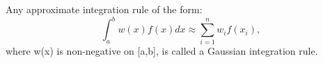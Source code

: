 Any approximate integration rule of the form:
\[ \int _a ^b w(x) f(x) dx \approx \sum _{i=1} ^n w_i f(x_i) , \] 
where w(x) is non-negative on [a,b],
is called a Gaussian integration rule.